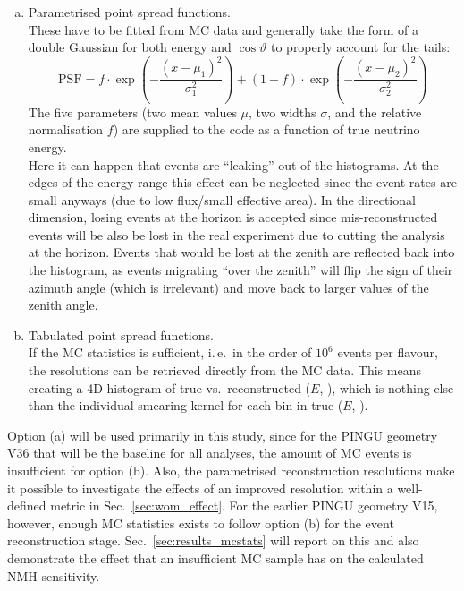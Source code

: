 \begin{enumerate}[(a)]
 \item Parametrised point spread functions.\\ These have to be fitted from MC
  data and generally take the form of a double Gaussian for both energy and
  $\cos\vartheta$ to properly account for the tails:
  \begin{equation}
   \mathrm{PSF} = f\cdot \exp\left(-\frac{(x-\mu_1)^2}{\sigma_1^2}\right)
                  + (1-f)\cdot \exp\left(-\frac{(x-\mu_2)^2}{\sigma_2^2}\right)
   \label{eqn:reco_param}
  \end{equation}
  The five parameters (two mean values $\mu$, two widths $\sigma$, and the
  relative normalisation $f$) are supplied to the code as a function of true
  neutrino energy.\\
  Here it can happen that events are ``leaking'' out of the histograms. At
  the edges of the energy range this effect can be neglected since the event
  rates are small anyways (due to low flux/small effective area). In the
  directional dimension, losing events at the horizon is accepted since
  mis-reconstructed events will be also be lost in the real experiment due to
  cutting the analysis at the horizon. Events that would be lost at the zenith
  are reflected back into the histogram, as events migrating ``over the
  zenith'' will flip the sign of their azimuth angle (which is irrelevant) and
  move back to larger values of the zenith angle.
 \item Tabulated point spread functions.\\ If the MC statistics is sufficient,
  i.\,e.\ in the order of $10^6$ events per flavour, the resolutions can be
  retrieved directly from the MC data. This means creating a 4D histogram of
  true vs.\ reconstructed ($E$, \coszen), which is nothing else than
  the individual smearing kernel for each bin in true ($E$, \coszen).
  \end{enumerate}
Option (a) will be used primarily in this study, since for the PINGU geometry
V36 that will be the baseline for all analyses, the amount of MC events is
insufficient for option (b). Also, the parametrised reconstruction resolutions
make it possible to investigate the effects of an improved resolution within a
well-defined metric in Sec.~\ref{sec:wom_effect}.
For the earlier PINGU geometry V15, however, enough MC statistics exists to
follow option (b) for the event reconstruction stage.
Sec.~\ref{sec:results_mcstats} will report on this and also demonstrate the
effect that an insufficient MC sample has on the calculated NMH sensitivity.

